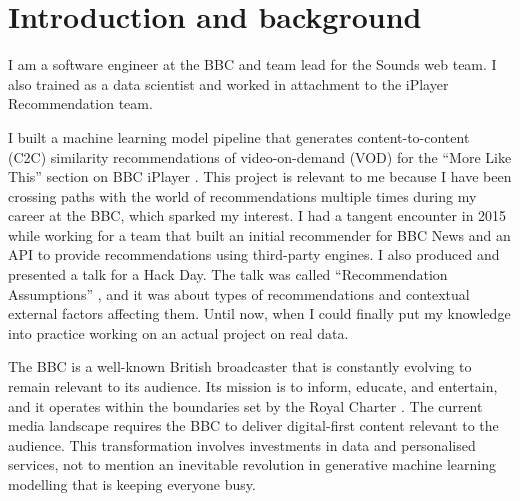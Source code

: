 
\newpage
{}

\section{Introduction and background}

I am a software engineer at the BBC and team lead for the Sounds web team.
I also trained as a data scientist and worked in attachment to the iPlayer Recommendation team.

I built a machine learning model pipeline that generates content-to-content (C2C) similarity recommendations
of video-on-demand (VOD) for the ``More Like This'' section on BBC iPlayer \cite{BBC:MoreLikeBluey}.
This project is relevant to me because I have been crossing paths with the world of recommendations multiple times
during my career at the BBC, which sparked my interest.
I had a tangent encounter in 2015 while working for a team that built
an initial recommender for BBC News and an API to provide recommendations using third-party engines.
I also produced and presented a talk for a Hack Day.
The talk was called ``Recommendation Assumptions'' \cite{RecsAssumptions},
and it was about types of recommendations and contextual external factors affecting them.
Until now, when I could finally put my knowledge into practice working on an actual project on real data.

The BBC is a well-known British broadcaster that is constantly evolving to remain relevant to its audience.
Its mission is to inform, educate, and entertain, and it operates within the boundaries set by the Royal Charter \cite{BBC:RoyalCharter}.
The current media landscape requires the BBC to deliver digital-first content relevant to the audience.
This transformation involves investments in data and personalised services,
not to mention an inevitable revolution in generative machine learning modelling that is keeping everyone busy.
